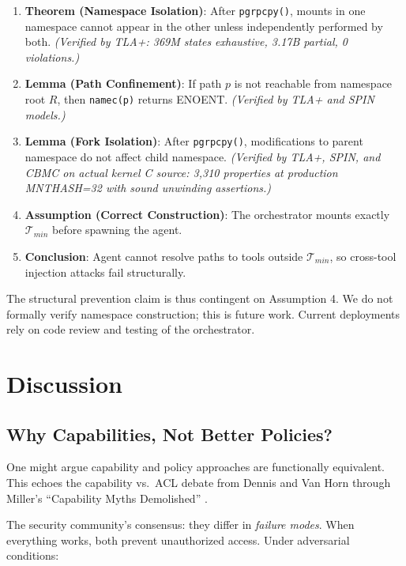 \documentclass{article}
\begin{document}
\begin{enumerate}
    \item \textbf{Theorem (Namespace Isolation)}: After \texttt{pgrpcpy()}, mounts in
    one namespace cannot appear in the other unless independently performed by both.
    \textit{(Verified by TLA+: 369M states exhaustive, 3.17B partial, 0 violations.)}
    \item \textbf{Lemma (Path Confinement)}: If path $p$ is not reachable from
    namespace root $R$, then \texttt{namec(p)} returns ENOENT.
    \textit{(Verified by TLA+ and SPIN models.)}
    \item \textbf{Lemma (Fork Isolation)}: After \texttt{pgrpcpy()}, modifications to
    parent namespace do not affect child namespace.
    \textit{(Verified by TLA+, SPIN, and CBMC on actual kernel C source: 3,310
    properties at production MNTHASH=32 with sound unwinding assertions.)}
    \item \textbf{Assumption (Correct Construction)}: The orchestrator mounts exactly
    $\mathcal{T}_{min}$ before spawning the agent.
    \item \textbf{Conclusion}: Agent cannot resolve paths to tools outside
    $\mathcal{T}_{min}$, so cross-tool injection attacks fail structurally.
\end{enumerate}

The structural prevention claim is thus contingent on Assumption 4. We do not
formally verify namespace construction; this is future work. Current deployments
rely on code review and testing of the orchestrator.

\section{Discussion}
\label{sec:discussion}

\subsection{Why Capabilities, Not Better Policies?}

One might argue capability and policy approaches are functionally equivalent. This echoes the capability vs.\ ACL debate from Dennis and Van Horn \cite{dennis1966capabilities} through Miller's ``Capability Myths Demolished'' \cite{miller2006capability}.

The security community's consensus: they differ in \textit{failure modes}. When everything works, both prevent unauthorized access. Under adversarial conditions:
\end{document}
